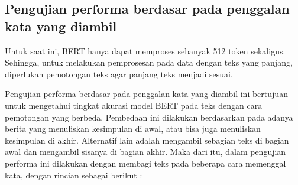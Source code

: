 \subsection{Pengujian performa berdasar pada penggalan kata yang diambil}

Untuk saat ini, BERT hanya dapat memproses sebanyak 512 token sekaligus. Sehingga, untuk melakukan pemprosesan pada data dengan teks yang panjang, diperlukan pemotongan teks agar panjang teks menjadi sesuai.

Pengujian performa berdasar pada penggalan kata yang diambil ini bertujuan untuk mengetahui tingkat akurasi model BERT pada teks dengan cara pemotongan yang berbeda. Pembedaan ini dilakukan berdasarkan pada adanya berita yang menuliskan kesimpulan di awal, atau bisa juga menuliskan kesimpulan di akhir. Alternatif lain adalah mengambil sebagian teks di bagian awal dan mengambil sisanya di bagian akhir. Maka dari itu, dalam pengujian performa ini dilakukan dengan membagi teks pada beberapa cara memenggal kata, dengan rincian sebagai berikut :

